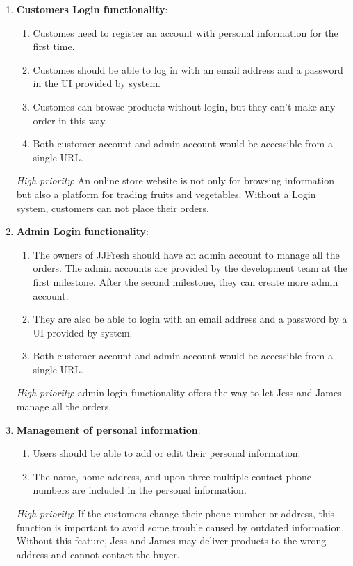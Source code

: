 \documentclass{report}
\begin{document}
\begin{enumerate}
  \item \textbf{Customers Login functionality}: 
  \begin{enumerate}
    \item Customes need to register an account with personal information for the first time. 
    \item Customes should be able to log in with an email address and a password in the UI provided by system. 
    \item Customes can browse products without login, but they can't make any order in this way. 
    \item Both customer account and admin account would be accessible from a single URL.
  \end{enumerate}

  \textit{High priority}: An online store website is not only for browsing information but also a platform for trading fruits and vegetables. Without a Login system, customers can not place their orders.
  
  \item \textbf{Admin Login functionality}: 
  \begin{enumerate}
    \item The owners of JJFresh should have an admin account to manage all the orders. The admin accounts are provided by the development team at the first milestone. After the second milestone, they can create more admin account.
    \item They are also be able to login with an email address and a password by a UI provided by system.
    \item Both customer account and admin account would be accessible from a single URL.
  \end{enumerate}

  \textit{High priority}: admin login functionality offers the way to let Jess and James manage all the orders.

  \item \textbf{Management of personal information}: 
  \begin{enumerate}
    \item Users should be able to add or edit their personal information. 
    \item The name, home address, and upon three multiple contact phone numbers are included in the personal information.
  \end{enumerate}

  \textit{High priority}: If the customers change their phone number or address, this function is important to avoid some trouble caused by outdated information. Without this feature, Jess and James may deliver products to the wrong address and cannot contact the buyer.


\end{enumerate}
\end{document}
